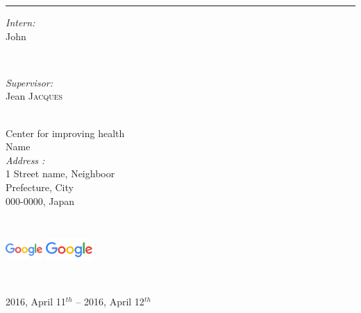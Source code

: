 \begin{titlepage}
\begin{center}
\begin{minipage}{0.8\textwidth}
\begin{center}
        \rule{1\textwidth}{.1pt}
        \end{center}\end{minipage}\vspace{1cm}

	\begin{minipage}{0.4\textwidth}
	\begin{flushleft} \large
	\emph{Intern:}\\
	John 
	\end{flushleft}
	\end{minipage}
	~
	\begin{minipage}{0.4\textwidth}
	\begin{flushright} \large
	\emph{Supervisor:} \\
	Jean \textsc{Jacques}
	\end{flushright}
	\end{minipage}

\end{center}

\vfill

\begin{center}
\large {}\\[0.1cm]
Center for improving health\\
Name\\[.4cm]
\textit{Address :}\\
1 Street name, Neighboor\\
Prefecture, City\\
000-0000, Japan 
\end{center}

\begin{center}
	\includegraphics[height = 70pt, width = 40pt]{logos/logo.png}\qquad
	\includegraphics[height = 70pt, width = 50pt]{logos/logo.png}
\end{center}

\begin{center}
{\large 2016, April 11$^{th}$ -- 2016, April 12$^{th}$}
\end{center}

\vfill

\end{titlepage}
\restoregeometry{}
